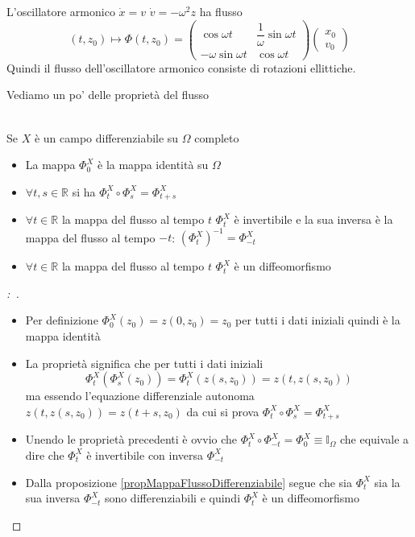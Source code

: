 \documentclass[11pt,a4paper,twoside]{book}
\newenvironment{proposizione}[1][\empty]{\begin{Proposizione}{
\ifx\empty#1\relax\else\mdseries\itshape#1\\\fi
}{}}{\end{Proposizione}}
\newenvironment{esempio}[1][Esempio]{ 
  \begin{center}\begin{tcolorbox}[
  title={#1:\\},
  width=0.9\linewidth,
  flush right,
  enhanced jigsaw, 
  colback=white, 
  frame hidden, 
  sharpish corners, arc=3mm,
  borderline west = {1pt}{0pt}{gray},
  borderline south = {1pt}{0pt}{gray},
  coltitle=black, 
  fonttitle=\small\bfseries, 
  attach title to upper, 
  breakable,
  top=2.5pt, bottom=0.3pt]\small
  }{
 \normalsize \end{tcolorbox}\end{center}
}
\newenvironment{dimo}[1][\proofname]{
	\begin{tcolorbox}[
	breakable, 
	enhanced, 
	interior hidden, 
	frame hidden, 
	borderline west = {1pt}{0pt}{gray}, 
	top=0pt, bottom=0pt, left=0pt]
\begin{proof}[#1:~]
}
{
\end{proof}
\end{tcolorbox}
}
\theoremstyle{esss}
\theoremstyle{dotless}
\numberwithin{equation}{section} %
\begin{document}
\begin{esempio}
L'oscillatore armonico $\dot{x}=v $ $\dot{v}=-\omega^2 z$ ha flusso
\[
(t,z_0)\mapsto\Phi(t,z_0)=\left(\begin{array}{cc}
\cos{\omega t} & \dfrac{1}{\omega} \sin{\omega t} \\
-\omega \sin{\omega t} & \cos{\omega t}
\end{array}\right) \left(\begin{array}{c}
x_0 \\ v_0
\end{array}\right)
\]
Quindi il flusso dell'oscillatore armonico consiste di rotazioni ellittiche.

\end{esempio}

Vediamo un po' delle proprietà del flusso

\begin{proposizione}Se $X$ è un campo differenziabile su $\Omega$ completo \begin{itemize}
\item La mappa $\Phi^X_0$ è la mappa identità su $\Omega$
\item $\forall t,s\in\mathbb{R}$ si ha $\Phi_t^X \circ \Phi^X_s=\Phi^X_{t+s}$
\item $\forall t\in\mathbb{R}$ la mappa del flusso al tempo $t$ $\Phi^X_t$ è invertibile e la sua inversa è la mappa del flusso al tempo $-t$: $(\Phi^X_t)^{-1}=\Phi^X_{-t}$
\item $\forall t\in\mathbb{R}$ la mappa del flusso al tempo $t$ $\Phi^X_t$ è un diffeomorfismo
\end{itemize}
\end{proposizione}
\begin{dimo}$ $ \begin{itemize}
\item Per definizione $\Phi_0^X(z_0)=z(0,z_0)=z_0$ per tutti i dati iniziali quindi è la mappa identità
\item La proprietà significa che per tutti i dati iniziali
\[
\Phi^X_t(\Phi^X_s(z_0))=\Phi^X_t(z(s,z_0))=z(t,z(s,z_0))
\]
ma essendo l'equazione differenziale autonoma $z(t,z(s,z_0))=z(t+s,z_0)$ da cui si prova 
$\Phi_t^X \circ \Phi^X_s=\Phi^X_{t+s}$
\item Unendo le proprietà precedenti è ovvio che $\Phi_t^X \circ \Phi^X_{-t}=\Phi^X_{0}\equiv\mathbb{I}_\Omega$ che equivale a dire che $\Phi_t^X$ è invertibile con inversa $\Phi_{-t}^X$
\item Dalla proposizione \ref{propMappaFlussoDifferenziabile} segue che sia $\Phi^X_t$ sia la sua inversa $\Phi^X_{-t}$ sono differenziabili e quindi $\Phi^X_t$ è un diffeomorfismo
\end{itemize}
\end{dimo}
\end{document}
